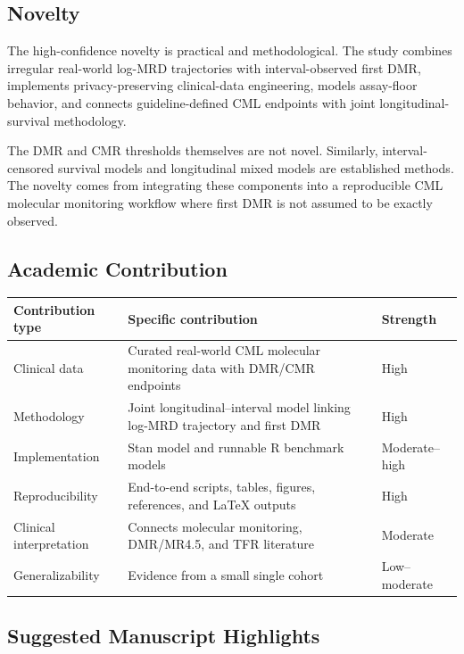 \subsection{Novelty}

The high-confidence novelty is practical and methodological. The study combines irregular real-world log-MRD trajectories with interval-observed first DMR, implements privacy-preserving clinical-data engineering, models assay-floor behavior, and connects guideline-defined CML endpoints with joint longitudinal-survival methodology.

The DMR and CMR thresholds themselves are not novel. Similarly, interval-censored survival models and longitudinal mixed models are established methods. The novelty comes from integrating these components into a reproducible CML molecular monitoring workflow where first DMR is not assumed to be exactly observed.

\subsection{Academic Contribution}

\begin{center}
\begin{tabular}{p{}p{}p{}}
\toprule
Contribution type & Specific contribution & Strength\\
\midrule
Clinical data & Curated real-world CML molecular monitoring data with DMR/CMR endpoints & High\\
Methodology & Joint longitudinal--interval model linking log-MRD trajectory and first DMR & High\\
Implementation & Stan model and runnable R benchmark models & Moderate--high\\
Reproducibility & End-to-end scripts, tables, figures, references, and LaTeX outputs & High\\
Clinical interpretation & Connects molecular monitoring, DMR/MR4.5, and TFR literature & Moderate\\
Generalizability & Evidence from a small single cohort & Low--moderate\\
\bottomrule
\end{tabular}
\end{center}

\subsection{Suggested Manuscript Highlights}

